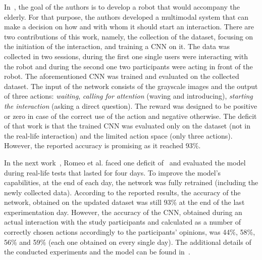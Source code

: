 \documentclass[thesis]{mas_proposal}
\begin{document}
In~\cite{Romeo2018}, the goal of the authors is to develop a robot that would accompany the elderly. For that purpose, the authors developed a multimodal system that can make a decision on how and with whom it should start an interaction. There are two contributions of this work, namely, the collection of the dataset, focusing on the initiation of the interaction, and training a CNN on it. The data was collected in two sessions, during the first one single users were interacting with the robot and during the second one two participants were acting in front of the robot. The aforementioned CNN was trained and evaluated on the collected dataset. The input of the network consists of the grayscale images and the output of three actions: \emph{waiting}, \emph{calling for attention} (waving and introducing), \emph{starting the interaction} (asking a direct question). The reward was designed to be positive or zero in case of the correct use of the action and negative otherwise. The deficit of that work is that the trained CNN was evaluated only on the dataset (not in the real-life interaction) and the limited action space (only three actions). However, the reported accuracy is promising as it reached 93\%. 

In the next work~\cite{Romeo2019}, Romeo et al. faced one deficit of~\cite{Romeo2018} and evaluated the model during real-life tests that lasted for four days. To improve the model's capabilities, at the end of each day, the network was fully retrained (including the newly collected data). According to the reported results, the accuracy of the network, obtained on the updated dataset was still 93\% at the end of the last experimentation day. However, the accuracy of the CNN, obtained during an actual interaction with the study participants and calculated as a number of correctly chosen actions accordingly to the participants' opinions, was 44\%, 58\%, 56\% and 59\% (each one obtained on every single day). The additional details of the conducted experiments and the model can be found in~\cite{romeo2021human}.
\end{document}
